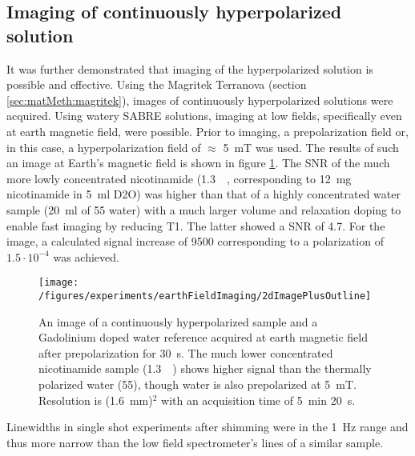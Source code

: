     \subsection{Imaging of continuously hyperpolarized solution}
    It was further demonstrated that imaging of the hyperpolarized solution is possible and effective.
    Using the Magritek Terranova (section \ref{sec:matMeth:magritek}), images of continuously hyperpolarized solutions were acquired. Using watery SABRE solutions, imaging at low fields, specifically even at earth magnetic field, were possible. Prior to imaging, a prepolarization field or, in this case, a hyperpolarization field of $\approx$ \SI{5}{\milli\tesla} was used. The results of such an image at Earth's magnetic field is shown in figure \ref{fig:results:earthFieldImage}.  The SNR of the much more lowly concentrated nicotinamide (\SI{1.3}{\milli\Molar}, corresponding to \SI{12}{\milli\gram} nicotinamide in \SI{5}{\milli\litre} D2O) was higher than that of a highly concentrated water sample (\SI{20}{\milli\litre} of \SI{55}{\Molar} water) with a much larger volume and relaxation doping to enable fast imaging by reducing T1. The latter showed a SNR of 4.7. For the image, a calculated signal increase of 9500 corresponding to a polarization of $1.5\cdot 10^{-4}$ was achieved.
    \begin{figure}
            \texttt{[image: /figures/experiments/earthFieldImaging/2dImagePlusOutline]}
            \caption[Earth field SABRE image]{An image of a continuously hyperpolarized sample and a Gadolinium doped water reference acquired at earth magnetic field after prepolarization for \SI{30}{\second}. The much lower concentrated nicotinamide sample (\SI{1.3}{\milli\Molar}) shows higher signal than the thermally polarized water (\SI{55}{\Molar}), though water is also prepolarized at \SI{5}{\milli\tesla}. Resolution is (\SI{1.6}{\milli\meter})$^2$ with an acquisition time of \SI{5}{\minute} \SI{20}{\second}.}
            \label{fig:results:earthFieldImage}
        \end{figure}
        Linewidths in single shot experiments after shimming were in the \SI{1}{\hertz} range and thus more narrow than the low field spectrometer's lines of a similar sample. 
